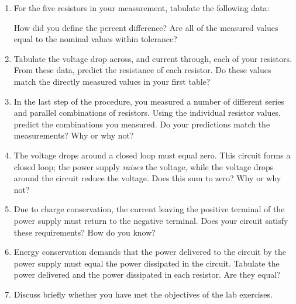\documentclass[12pt]{article}
\begin{document}
\begin{enumerate}
\item For the five resistors in your measurement, tabulate the
  following data:
  How did you define the percent difference? Are all of the measured
  values equal to the nominal values within tolerance?
\item Tabulate the voltage drop across, and current through, each of
  your resistors.  From these data, predict the resistance of each
  resistor.  Do these values match the directly measured values in
  your first table?
\item In the last step of the procedure, you measured a number of
  different series and parallel combinations of resistors.  Using the
  individual resistor values, predict the combinations you measured.
  Do your predictions match the measurements?  Why or why not?
\item The voltage drops around a closed loop must equal zero.  This
  circuit forms a closed loop; the power supply \textit{raises} the
  voltage, while the voltage drops around the circuit reduce the
  voltage.  Does this sum to zero?  Why or why not?  
\item Due to charge conservation, the current leaving the positive
  terminal of the power supply must return to the negative terminal.
  Does your circuit satisfy these requirements?  How do you know?
\item Energy conservation demands that the power delivered to the
  circuit by the power supply must equal the power dissipated in the
  circuit.  Tabulate the power delivered and the power dissipated in
  each resistor.  Are they equal?
\item Discuss briefly whether you have met the objectives of the lab
  exercises.
\end{enumerate}
\end{document}

